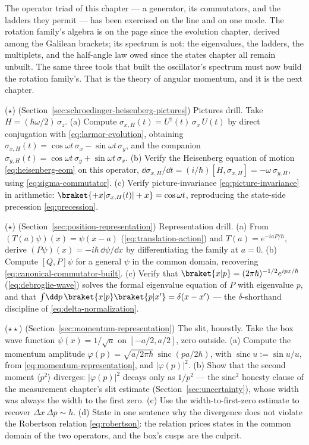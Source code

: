 The operator triad of this chapter --- a generator, its commutators, and the ladders they permit --- has been exercised on the line and on one mode. The rotation family's algebra is on the page since the evolution chapter, derived among the Galilean brackets; its spectrum is not: the eigenvalues, the ladders, the multiplets, and the half-angle law owed since the states chapter all remain unbuilt. The same three tools that built the oscillator's spectrum must now build the rotation family's. That is the theory of angular momentum, and it is the next chapter.

\begin{problemset}
\item ($\star$) (Section~\ref{sec:schroedinger-heisenberg-pictures}) Pictures drill. Take $H = (\hbar\omega/2)\,\sigma_z$. (a) Compute $\sigma_{x,H}(t) = U^\dagger(t)\,\sigma_x\,U(t)$ by direct conjugation with \eqref{eq:larmor-evolution}, obtaining $\sigma_{x,H}(t) = \cos\omega t\,\sigma_x - \sin\omega t\,\sigma_y$, and the companion $\sigma_{y,H}(t) = \cos\omega t\,\sigma_y + \sin\omega t\,\sigma_x$. (b) Verify the Heisenberg equation of motion \eqref{eq:heisenberg-eom} on this operator, $\dd\sigma_{x,H}/\dd t = (i/\hbar)[H, \sigma_{x,H}] = -\omega\,\sigma_{y,H}$, using \eqref{eq:sigma-commutator}. (c) Verify picture-invariance \eqref{eq:picture-invariance} in arithmetic: $\braket{+x|\sigma_{x,H}(t)|+x} = \cos\omega t$, reproducing the state-side precession \eqref{eq:precession}.

\item ($\star$) (Section~\ref{sec:position-representation}) Representation drill. (a) From $(T(a)\psi)(x) = \psi(x - a)$ (\eqref{eq:translation-action}) and $T(a) = e^{-iaP/\hbar}$, derive $(P\psi)(x) = -i\hbar\,\dd\psi/\dd x$ by differentiating the family at $a = 0$. (b) Compute $[Q, P]\psi$ for a general $\psi$ in the common domain, recovering \eqref{eq:canonical-commutator-built}. (c) Verify that $\braket{x|p} = (2\pi\hbar)^{-1/2}e^{ipx/\hbar}$ (\eqref{eq:debroglie-wave}) solves the formal eigenvalue equation of $P$ with eigenvalue $p$, and that $\int\!\dd p\,\braket{x|p}\braket{p|x'} = \delta(x - x')$ --- the $\delta$-shorthand discipline of \eqref{eq:delta-normalization}.

\item ($\star\star$) (Section~\ref{sec:momentum-representation}) The slit, honestly. Take the box wave function $\psi(x) = 1/\sqrt{a}$ on $[-a/2, a/2]$, zero outside. (a) Compute the momentum amplitude $\varphi(p) = \sqrt{a/2\pi\hbar}\,\operatorname{sinc}(pa/2\hbar)$, with $\operatorname{sinc} u := \sin u/u$, from \eqref{eq:momentum-representation}, and $|\varphi(p)|^2$. (b) Show that the second moment $\langle p^2\rangle$ diverges: $|\varphi(p)|^2$ decays only as $1/p^2$ --- the sinc$^2$ honesty clause of the measurement chapter's slit estimate (Section~\ref{sec:uncertainty}), whose width was always the width to the first zero. (c) Use the width-to-first-zero estimate to recover $\Delta x\,\Delta p \sim h$. (d) State in one sentence why the divergence does not violate the Robertson relation \eqref{eq:robertson}: the relation prices states in the common domain of the two operators, and the box's cusps are the culprit.


\end{problemset}
